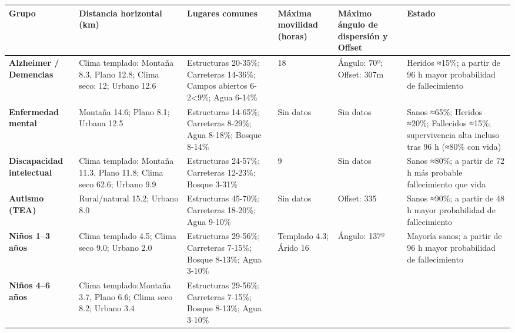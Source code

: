 \begin{table}[htbp]
\centering
\footnotesize
\begin{tabular}{ |m{2cm}|m{2.5cm}|m{3cm}|m{1.8cm}|m{2cm}|m{3.0cm}| } 
\hline
\cellcolor[HTML]{B9E3F0}\centering\textbf{Grupo} & \cellcolor[HTML]{B9E3F0}\textbf{Distancia horizontal (km)} & \cellcolor[HTML]{B9E3F0}\textbf{Lugares comunes} & \cellcolor[HTML]{B9E3F0}\textbf{Máxima movilidad (horas)} & \cellcolor[HTML]{B9E3F0}\textbf{Máximo ángulo de dispersión y Offset} & \cellcolor[HTML]{B9E3F0}\textbf{Estado} \\
\hline
\cellcolor[HTML]{EFEFEF}\textbf{Alzheimer / Demencias} 
    & {Clima templado: Montaña 8.3, Plano 12.8; Clima seco: 12; Urbano 12.6} 
    & {Estructuras 20-35\%; Carreteras 14-36\%; Campos abiertos 6-2<9\%; Agua 6-14\%} 
    & {18} 
    & {Ángulo: 70º; Offset: 307m} 
    & {Heridos ≈15\%; a partir de 96 h mayor probabilidad de fallecimiento} \\
\hline
\cellcolor[HTML]{EFEFEF}\textbf{Enfermedad mental} 
    & {Montaña 14.6; Plano 8.1; Urbana 12.5} 
    & {Estructuras 14-65\%; Carreteras 8-29\%; Agua 8-18\%; Bosque 8-14\%} 
    & {Sin datos} 
    & {Sin datos} 
    & {Sanos ≈65\%; Heridos ≈20\%; Fallecidos ≈15\%; supervivencia alta incluso tras 96 h (≈80\% con vida)} \\
\hline
\cellcolor[HTML]{EFEFEF}\textbf{Discapacidad intelectual} 
    & {Clima templado: Montaña 11.3, Plano 11.8; Clima seco 62.6; Urbano 9.9} 
    & {Estructuras 24-57\%; Carreteras 12-23\%; Bosque 3-31\%} 
    & {9} 
    & {Sin datos} 
    & {Sanos ≈80\%; a partir de 72 h más probable fallecimiento que vida} \\
\hline
\cellcolor[HTML]{EFEFEF}\textbf{Autismo (TEA)} 
    & {Rural/natural 15.2; Urbano 8.0} 
    & {Estructuras 45-70\%; Carreteras 18-20\%; Agua 9-10\%} 
    & {Sin datos} 
    & {Offset: 335} 
    & {Sanos ≈90\%; a partir de 48 h mayor probabilidad de fallecimiento} \\
\hline
\cellcolor[HTML]{EFEFEF}\textbf{Niños 1--3 años} 
    & {Clima templado 4.5; Clima seco 9.0; Urbano 2.0} 
    & {Estructuras 29-56\%; Carreteras 7-15\%; Bosque 8-13\%; Agua 3-10\%} 
    & {Templado 4.3; Árido 16} 
    & {Ángulo: 137º} 
    & {Mayoría sanos; a partir de 96 h mayor probabilidad de fallecimiento} \\
\hline
\cellcolor[HTML]{EFEFEF}\textbf{Niños 4--6 años} 
    & {Clima templado:Montaña 3.7, Plano 6.6; Clima seco 8.2; Urbano 3.4} 
    & {Estructuras 29-56\%; Carreteras 7-15\%; Bosque 8-13\%; Agua 3-10\%} 

\end{tabular}
\end{table}
